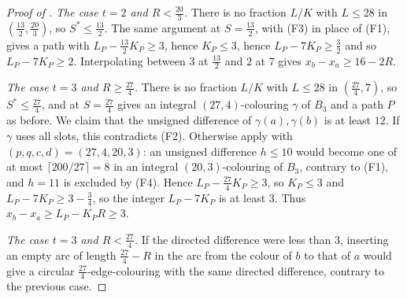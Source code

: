 \documentclass[11pt,colorlinks]{charlie}
\begin{document}
\begin{proof}[Proof of ]
\emph{The case $t=2$ and $R<\frac{20}{3}$.} There is no fraction $L/K$ with $L\le28$ in $(\frac{13}{2},\frac{20}{3})$, so $S^*\le\frac{13}{2}$. The same argument at $S=\frac{13}{2}$, with (F3) in place of (F1), gives a path with $L_P-\frac{13}{2}K_P\ge3$, hence $K_P\le3$, hence $L_P-7K_P\ge\frac32$ and so $L_P-7K_P\ge2$. Interpolating between $3$ at $\frac{13}{2}$ and $2$ at $7$ gives $x_b-x_a\ge16-2R$.

\emph{The case $t=3$ and $R\ge\frac{27}{4}$.} There is no fraction $L/K$ with $L\le28$ in $(\frac{27}{4},7)$, so $S^*\le\frac{27}{4}$, and  at $S=\frac{27}{4}$ gives an integral $(27,4)$-colouring $\gamma$ of $B_3$ and a path $P$ as before. We claim that the unsigned difference of $\gamma(a),\gamma(b)$ is at least $12$. If $\gamma$ uses all slots, this contradicts (F2). Otherwise apply  with $(p,q,c,d)=(27,4,20,3)$: an unsigned difference $h\le10$ would become one of at most $\lceil200/27\rceil=8$ in an integral $(20,3)$-colouring of $B_3$, contrary to (F1), and $h=11$ is excluded by (F4). Hence $L_P-\frac{27}{4}K_P\ge3$, so $K_P\le3$ and $L_P-7K_P\ge3-\frac34$, so the integer $L_P-7K_P$ is at least $3$. Thus $x_b-x_a\ge L_P-K_PR\ge3$.

\emph{The case $t=3$ and $R<\frac{27}{4}$.} If the directed difference were less than $3$, inserting an empty arc of length $\frac{27}{4}-R$ in the arc from the colour of $b$ to that of $a$ would give a circular $\frac{27}{4}$-edge-colouring with the same directed difference, contrary to the previous case.
\end{proof}
\end{document}
